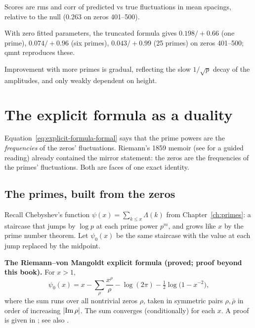 \begin{keyideas}
\item Scores are rms and corr of predicted vs true fluctuations in mean spacings, relative to the null ($0.263$ on zeros 401--500).
\item With zero fitted parameters, the truncated formula gives $0.198/+0.66$ (one prime), $0.074/+0.96$ (six primes), $0.043/+0.99$ (25 primes) on zeros 401--500; qmnt reproduces these.
\item Improvement with more primes is gradual, reflecting the slow $1/\sqrt p$ decay of the amplitudes, and only weakly dependent on height.
\end{keyideas}

\section{The explicit formula as a duality}\label{sec:explicit-formula-duality}

Equation~\eqref{eq:explicit-formula-formal} says that the prime powers are the \emph{frequencies} of the zeros' fluctuations. Riemann's 1859 memoir \cite{riemann1859} (see \cite{edwards} for a guided reading) already contained the mirror statement: the zeros are the frequencies of the primes' fluctuations. Both are faces of one exact identity.

\subsection{The primes, built from the zeros}

Recall Chebyshev's function $\psi(x)=\sum_{k\le x}\Lambda(k)$ from Chapter~\ref{ch:primes}: a staircase that jumps by $\log p$ at each prime power $p^m$, and grows like $x$ by the prime number theorem. Let $\psi_0(x)$ be the same staircase with the value at each jump replaced by the midpoint.

\begin{beyond}
\textbf{The Riemann--von Mangoldt explicit formula (proved; proof beyond this book).} For $x>1$,
\begin{equation}
\psi_0(x)=x-\sum_{\rho}\frac{x^{\rho}}{\rho}-\log(2\pi)-\tfrac12\log\bigl(1-x^{-2}\bigr),
\label{eq:explicit-formula-psi}
\end{equation}
where the sum runs over all nontrivial zeros $\rho$, taken in symmetric pairs $\rho,\bar\rho$ in order of increasing $\left\lvert \operatorname{Im}\rho\right\rvert$. The sum converges (conditionally) for each $x$. A proof is given in \cite{davenport}; see also \cite{edwards}.
\end{beyond}

